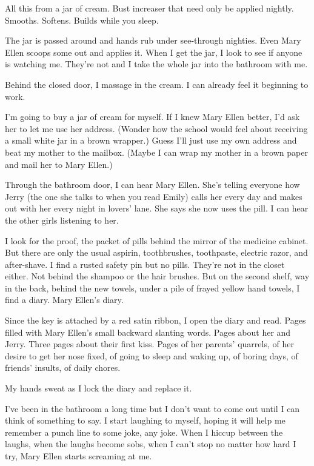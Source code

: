 \documentclass[twoside,10pt]{book}
\begin{document}
All this from a jar of cream. Bust increaser that need only be applied
nightly. Smooths. Softens. Builds while you sleep.

The jar is passed around and hands rub under see-through nighties. Even
Mary Ellen scoops some out and applies it. When I get the jar, I look to
see if anyone is watching me. They're not and I take the whole jar into
the bathroom with me.

Behind the closed door, I massage in the cream. I can already feel it
beginning to work.

I'm going to buy a jar of cream for myself. If I knew Mary Ellen better,
I'd ask her to let me use her address. (Wonder how the school would feel
about receiving a small white jar in a brown wrapper.) Guess I'll just
use my own address and beat my mother to the mailbox. (Maybe I can wrap
my mother in a brown paper and mail her to Mary Ellen.)

Through the bathroom door, I can hear Mary Ellen. She's telling everyone
how Jerry (the one she talks to when you read Emily) calls her every day
and makes out with her every night in lovers' lane. She says she now
uses the pill. I can hear the other girls listening to her.

I look for the proof, the packet of pills behind the mirror of the
medicine cabinet. But there are only the usual aspirin, toothbrushes,
toothpaste, electric razor, and after-shave. I find a rusted safety pin
but no pills. They're not in the closet either. Not behind the shampoo
or the hair brushes. But on the second shelf, way in the back, behind
the new towels, under a pile of frayed yellow hand towels, I find a
diary. Mary Ellen's diary.

Since the key is attached by a red satin ribbon, I open the diary and
read. Pages filled with Mary Ellen's small backward slanting words.
Pages about her and Jerry. Three pages about their first kiss. Pages of
her parents' quarrels, of her desire to get her nose fixed, of going to
sleep and waking up, of boring days, of friends' insults, of daily
chores.

My hands sweat as I lock the diary and replace it.

I've been in the bathroom a long time but I don't want to come out until
I can think of some­thing to say. I start laughing to myself, hoping it
will help me remember a punch line to some joke, any joke. When I hiccup
between the laughs, when the laughs become sobs, when I can't stop no
matter how hard I try, Mary Ellen starts screaming at me.
\end{document}
